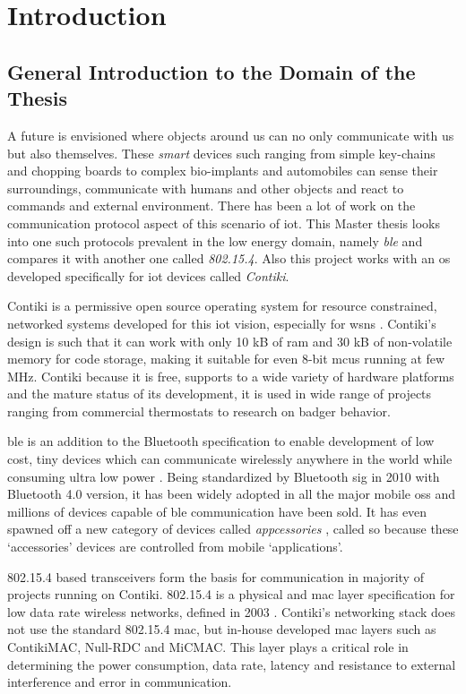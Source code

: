 \chapter{Introduction}

\section{General Introduction to the Domain of the Thesis}

A future is envisioned where objects around us can no only communicate with us but also themselves. These \emph{smart} devices such ranging from simple key-chains and chopping boards to complex bio-implants and automobiles can sense their surroundings, communicate with humans and other objects and react to commands and external environment. There has been a lot of work on the communication protocol aspect of this scenario of \gls{iot}. This Master thesis looks into one such protocols prevalent in the low energy domain, namely \emph{\gls{ble}} and compares it with another one called \emph{802.15.4}. Also this project works with an \gls{os} developed specifically for \gls{iot} devices called \emph{Contiki}.

Contiki is a permissive open source operating system for resource constrained, networked systems developed for this \gls{iot} vision, especially for \glspl{wsn} \cite{Contiki}. Contiki's design is such that it can work with only 10 kB of \gls{ram} and 30 kB of non-volatile memory for code storage, making it suitable for even 8-bit \glspl{mcu} running at few MHz. Contiki because it is free, supports to a wide variety of hardware platforms and the mature status of its development, it is used in wide range of projects ranging from commercial thermostats to research on badger behavior. 

\gls{ble} is an addition to the Bluetooth specification to enable  development of low cost, tiny devices which can communicate wirelessly anywhere in the world while consuming ultra low power \cite{CoreSpec4.0}. Being standardized by Bluetooth \gls{sig} in 2010 with Bluetooth 4.0 version, it has been widely adopted in all the major mobile \glspl{os} and millions of devices capable of \gls{ble} communication have been sold. It has even spawned off a new category of devices called \emph{appcessories} \cite{ubiquityBeyond}, called so because these `accessories' devices are controlled from mobile `applications'. 

802.15.4 based transceivers form the basis for communication in majority of projects running on Contiki. 802.15.4 is a physical and \gls{mac} layer specification for low data rate wireless networks, defined in 2003 \cite{IEEE802154}. Contiki's networking stack does not use the standard 802.15.4 \gls{mac}, but in-house developed \gls{mac} layers such as ContikiMAC, Null-RDC and MiCMAC. This layer plays a critical role in determining the power consumption, data rate, latency and resistance to external interference and error in communication. 

